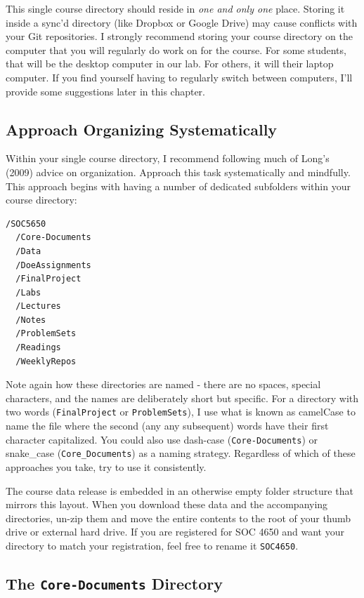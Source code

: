 \documentclass[]{book}
\theoremstyle{definition}
\theoremstyle{definition}
\theoremstyle{definition}
\theoremstyle{remark}
\begin{document}
This single course directory should reside in \emph{one and only one}
place. Storing it inside a sync'd directory (like Dropbox or Google
Drive) may cause conflicts with your Git repositories. I strongly
recommend storing your course directory on the computer that you will
regularly do work on for the course. For some students, that will be the
desktop computer in our lab. For others, it will their laptop computer.
If you find yourself having to regularly switch between computers, I'll
provide some suggestions later in this chapter.

\subsection{Approach Organizing
Systematically}\label{approach-organizing-systematically}

Within your single course directory, I recommend following much of
Long's (2009) advice on organization. Approach this task systematically
and mindfully. This approach begins with having a number of dedicated
subfolders within your course directory:

\begin{verbatim}
/SOC5650
  /Core-Documents
  /Data
  /DoeAssignments
  /FinalProject
  /Labs
  /Lectures
  /Notes
  /ProblemSets
  /Readings
  /WeeklyRepos
\end{verbatim}

Note again how these directories are named - there are no spaces,
special characters, and the names are deliberately short but specific.
For a directory with two words (\texttt{FinalProject} or
\texttt{ProblemSets}), I use what is known as camelCase to name the file
where the second (any any subsequent) words have their first character
capitalized. You could also use dash-case (\texttt{Core-Documents}) or
snake\_case (\texttt{Core\_Documents}) as a naming strategy. Regardless
of which of these approaches you take, try to use it consistently.

The course data release is embedded in an otherwise empty folder
structure that mirrors this layout. When you download these data and the
accompanying directories, un-zip them and move the entire contents to
the root of your thumb drive or external hard drive. If you are
registered for SOC 4650 and want your directory to match your
registration, feel free to rename it \texttt{SOC4650}.

\subsection{\texorpdfstring{The \texttt{Core-Documents}
Directory}{The Core-Documents Directory}}\label{the-core-documents-directory}
\end{document}

